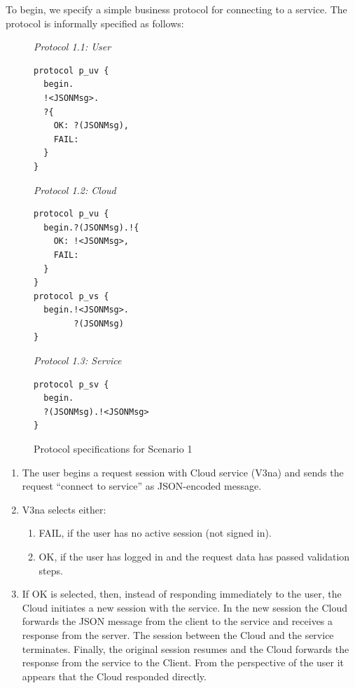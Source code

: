 \documentclass[10pt]{llncs}
\begin{document}
To begin, we specify a simple business protocol for connecting to a service. The protocol is informally specified as follows:
{
\lstset{
  framerule=0pt,
  numbers=none,
  basicstyle=\ttfamily\scriptsize,
}
\begin{figure}
\begin{minipage}[t]{0.30\textwidth}
{\it\footnotesize Protocol 1.1: User}
\begin{lstlisting}
protocol p_uv { 
  begin.
  !<JSONMsg>. 
  ?{
    OK: ?(JSONMsg),
    FAIL: 
  }
}
\end{lstlisting}
\end{minipage}
\begin{minipage}[t]{0.35\textwidth}
{\it\footnotesize Protocol 1.2: Cloud}
\begin{lstlisting}
protocol p_vu {
  begin.?(JSONMsg).!{
    OK: !<JSONMsg>,
    FAIL: 
  }
}
protocol p_vs { 
  begin.!<JSONMsg>.
        ?(JSONMsg)
}
\end{lstlisting}
\end{minipage}
\begin{minipage}[t]{0.30\textwidth}
\textit{Protocol 1.3: Service}
\begin{lstlisting}
protocol p_sv { 
  begin.
  ?(JSONMsg).!<JSONMsg> 
}
\end{lstlisting}
\end{minipage}
\caption{Protocol specifications for Scenario 1}\label{fig:protocols-sc1} 
\end{figure}
}

\begin{enumerate}
\item  The user begins a request session with Cloud service (V3na) and sends the request ``connect to service'' as JSON-encoded message.
\item  V3na selects either:
\begin{enumerate}
\item  FAIL, if the user has no active session (not signed in). %
\item  OK, if the user has logged in and the request data has passed validation steps. %
\end{enumerate}
\item  If OK is selected, then, instead of responding immediately to the user, the Cloud initiates a new session with the service. In the new session the Cloud forwards the JSON message from the client to the service and receives a response from the server. The session between the Cloud and the service terminates. Finally, the original session resumes and the Cloud forwards the response from the service to the Client.
From the perspective of the user it appears that the Cloud responded directly.
\end{enumerate}
\end{document}
